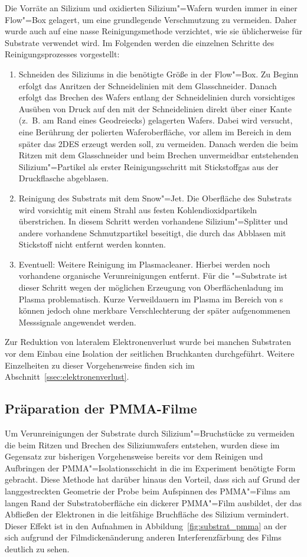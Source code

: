 Die Vorräte an Silizium und oxidierten Silizium"=Wafern wurden immer in einer Flow"=Box gelagert, um eine grundlegende Verschmutzung zu vermeiden. Daher wurde auch auf eine nasse Reinigungsmethode verzichtet, wie sie üblicherweise für Substrate verwendet wird. Im Folgenden werden die einzelnen Schritte des Reinigungsprozesses vorgestellt:
\begin{enumerate}
	\item Schneiden des Siliziums in die benötigte Größe in der Flow"=Box. Zu Beginn erfolgt das Anritzen der Schneidelinien mit dem Glasschneider. Danach erfolgt das Brechen des Wafers entlang der Schneidelinien durch vorsichtiges Ausüben von Druck auf den mit der Schneidelinien direkt über einer Kante (z.~B. am Rand eines Geodreiecks) gelagerten Wafers. Dabei wird versucht, eine Berührung der polierten Waferoberfläche, vor allem im Bereich in dem später das 2DES erzeugt werden soll, zu vermeiden. Danach werden die beim Ritzen mit dem Glasschneider und beim Brechen unvermeidbar entstehenden Silizium"=Partikel als erster Reinigungsschritt mit Stickstoffgas aus der Druckflasche abgeblasen.
	\item Reinigung des Substrats mit dem \glqq Snow"=Jet\grqq. Die Oberfläche des Substrats wird vorsichtig mit einem Strahl aus festen Kohlendioxidpartikeln überstrichen. In diesem Schritt werden vorhandene Silizium"=Splitter und andere vorhandene Schmutzpartikel beseitigt, die durch das Abblasen mit Stickstoff nicht entfernt werden konnten.
	\item Eventuell: Weitere Reinigung im Plasmacleaner. Hierbei werden noch vorhandene organische Verunreinigungen entfernt. Für die \SiO"=Substrate ist dieser Schritt wegen der möglichen Erzeugung von Oberflächenladung im Plasma problematisch. Kurze Verweildauern im Plasma im Bereich von \unit[10--30]{s} können jedoch ohne merkbare Verschlechterung der später aufgenommenen Messsignale angewendet werden.
\end{enumerate}

Zur Reduktion von lateralem Elektronenverlust wurde bei manchen Substraten vor dem Einbau eine Isolation der seitlichen Bruchkanten durchgeführt. Weitere Einzelheiten zu dieser Vorgehensweise finden sich im Abschnitt~\ref{ssec:elektronenverlust}.

\subsection{Präparation der PMMA-Filme}
Um Verunreinigungen der Substrate durch Silizium"=Bruchstücke zu vermeiden die beim  Ritzen und Brechen des Siliziumwafers entstehen, wurden diese im Gegensatz zur bisherigen Vorgehensweise bereits vor dem Reinigen und Aufbringen der PMMA"=Isolationsschicht in die im Experiment benötigte Form gebracht. Diese Methode hat darüber hinaus den Vorteil, dass sich auf Grund der langgestreckten Geometrie der Probe beim Aufspinnen des PMMA"=Films am langen Rand der Substratoberfläche ein dickerer PMMA"=Film ausbildet, der das Abfließen der Elektronen in die leitfähige Bruchfläche des Silizium vermindert. Dieser Effekt ist in den Aufnahmen in Abbildung~\ref{fig:substrat_pmma} an der sich aufgrund der Filmdickenänderung anderen Interferenzfärbung des Films deutlich zu sehen.

